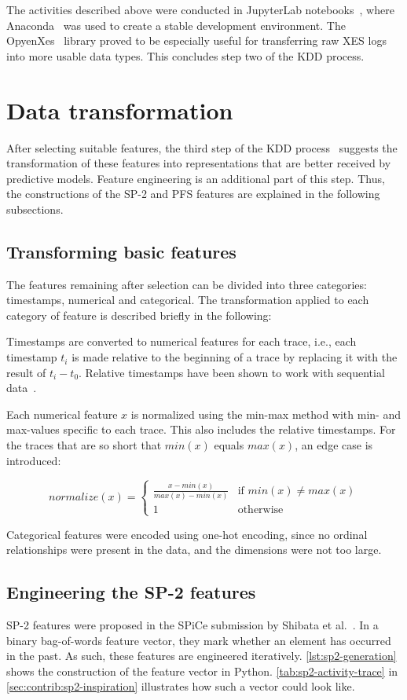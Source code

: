 The activities described above were conducted in JupyterLab notebooks~\cite{web:jupyter}, where Anaconda~\cite{web:anaconda} was used to create a stable development environment. The OpyenXes~\cite{web:opyenxes} library proved to be especially useful for transferring raw XES logs into more usable data types. This concludes step two of the KDD process.

\section{Data transformation}\label{sec:method:data-transformation}
After selecting suitable features, the third step of the KDD process~\cite{fayyad1996data} suggests the transformation of these features into representations that are better received by predictive models. Feature engineering is an additional part of this step. Thus, the constructions of the SP-2 and PFS features are explained in the following subsections.

\subsection*{Transforming basic features}
The features remaining after selection can be divided into three categories: timestamps, numerical and categorical. The transformation applied to each category of feature is described briefly in the following:

Timestamps are converted to numerical features for each trace, i.e., each timestamp $t_i$ is made relative to the beginning of a trace by replacing it with the result of $t_i - t_0$. Relative timestamps have been shown to work with sequential data~\cite{lessmannBADS}.

Each numerical feature $x$ is normalized using the min-max method with min- and max-values specific to each trace. This also includes the relative timestamps. For the traces that are so short that $min(x)$ equals $max(x)$, an edge case is introduced:

$$normalize(x) =
\begin{cases}
\frac{x-min(x)}{max(x)-min(x)} & \text{if } min(x) \neq max(x)\\
1 & \text{otherwise}
\end{cases}
$$

Categorical features were encoded using one-hot encoding, since no ordinal relationships were present in the data, and the dimensions were not too large.

\subsection*{Engineering the SP-2 features}
SP-2 features were proposed in the SPiCe submission by Shibata et al.~\cite{shibata2016bipartite}. In a binary bag-of-words feature vector, they mark whether an element has occurred in the past. As such, these features are engineered iteratively. \autoref{lst:sp2-generation} shows the construction of the feature vector in Python.
\autoref{tab:sp2-activity-trace} in \autoref{sec:contrib:sp2-inspiration} illustrates how such a vector could look like.

